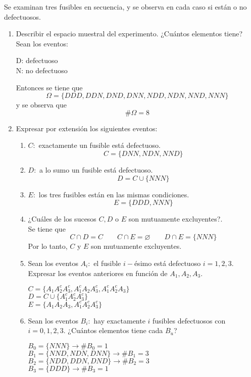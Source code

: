 \item Se examinan tres fusibles en secuencia, y se observa en cada caso si están o no defectuosos.
    \begin{enumerate}
        \item Describir el espacio muestral del experimento. ¿Cuántos elementos tiene?\vspace{3mm}\\
            Sean los eventos:
            \begin{center}
                D: defectuoso\\
                N: no defectuoso
            \end{center}
            Entonces se tiene que
            \[\Omega=\{DDD,DDN,DND,DNN,NDD,NDN,NND,NNN\}\]
            y se observa que
            \[\#\Omega=8\]
        \item Expresar por extensión los siguientes eventos:
            \begin{enumerate}
                \item $C:$ exactamente un fusible está defectuoso.
                    \[C=\{DNN,NDN,NND\}\]
                \item $D:$ a lo sumo un fusible está defectuoso.
                    \[D=C\cup\{NNN\}\]
                \item $E:$ los tres fusibles están en las mismas condiciones.
                    \[E=\{DDD,NNN\}\]
                \item ¿Cuáles de los sucesos $C,D$ o $E$ son mutuamente excluyentes?.\e\\
                    Se tiene que\[C\cap D=C\qquad C\cap E=\varnothing\qquad D\cap E=\{NNN\}\]
                    Por lo tanto, $C$ y $E$ son mutuamente excluyentes.\e
                \item Sean los eventos $A_i:$ el fusible $i-$ésimo está defectuoso $i=1,2,3$. Expresar los eventos anteriores en función de $A_1,A_2,A_3$.
                    \begin{center}
                        $C=\{A_1A_2^cA_3^c,A_1^cA_2A_3^c,A_1^cA_2^cA_3\}$\\
                        $D=C\cup\{A_1^cA_2^cA_3^c\}$\\
                        $E=\{A_1A_2A_3,A_1^cA_2^cA_3^c\}$
                    \end{center}\e
                \item Sean los eventos $B_i:$ hay exactamente $i$ fusibles defectuosos con $i=0,1,2,3$. ¿Cuántos elementos tiene cada $B_u$?
                    \begin{center}
                        $B_0=\{NNN\}\to \#B_0=1$\\
                        $B_1=\{NND,NDN,DNN\}\to\#B_1=3$\\
                        $B_2=\{NDD,DDN,DND\}\to\#B_2=3$\\
                        $B_3=\{DDD\}\to\#B_3=1$
                    \end{center}
            \end{enumerate}
    \end{enumerate}